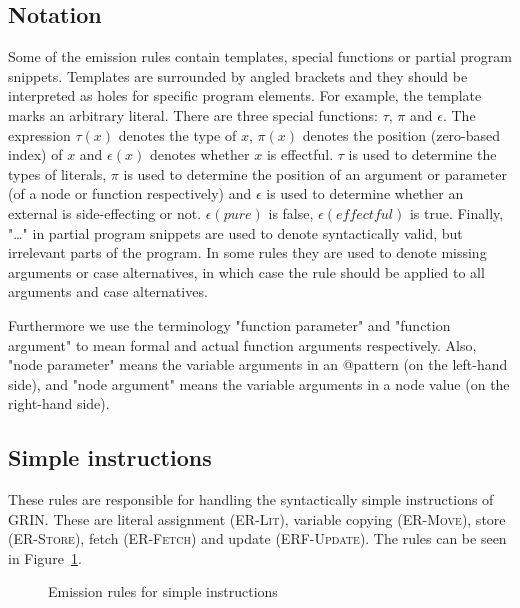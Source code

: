 \documentclass[main.tex]{subfiles}
\begin{document}
  \subsection{Notation}
  
  Some of the emission rules contain templates, special functions or partial program snippets. Templates are surrounded by angled brackets and they should be interpreted as holes for specific program elements. For example, the template  marks an arbitrary literal. There are three special functions: $\tau$, $\pi$ and $\epsilon$. The expression $\tau(x)$ denotes the type of $x$, $\pi(x)$ denotes the position (zero-based index) of $x$ and $\epsilon(x)$ denotes whether $x$ is effectful. $\tau$ is used to determine the types of literals, $\pi$ is used to determine the position of an argument or parameter (of a node or function respectively) and $\epsilon$ is used to determine whether an external is side-effecting or not. $\epsilon(pure)$ is false, $\epsilon(effectful)$ is true. Finally, "\dots{}" in partial program snippets are used to denote syntactically valid, but irrelevant parts of the program. In some rules they are used to denote missing arguments or case alternatives, in which case the rule should be applied to all arguments and case alternatives.
  
  Furthermore we use the terminology "function parameter" and "function argument" to mean formal and actual function arguments respectively. Also, "node parameter" means the variable arguments in an @pattern (on the left-hand side), and "node argument" means the variable arguments in a node value (on the right-hand side).
  
  \subsection{Simple instructions}
  
  These rules are responsible for handling the syntactically simple instructions of GRIN. These are literal assignment (\textsc{ER-Lit}), variable copying (\textsc{ER-Move}), store (\textsc{ER-Store}), fetch (\textsc{ER-Fetch}) and update (\textsc{ERF-Update}). The rules can be seen in Figure~\ref{fig:er-simple}. 

  \begin{figure}[h]
  \caption{Emission rules for simple instructions}
  \label{fig:er-simple}
  \end{figure}
\end{document}
